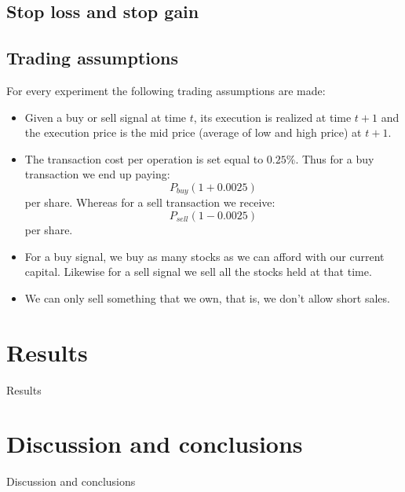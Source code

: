 \documentclass[preprint,3p,twocolumn]{elsarticle}
\begin{document}
\subsection{Stop loss and stop gain}
\label{subsec:stop loss and stop gain}

\subsection{Trading assumptions}
\label{subsec:trading-assumptions}
For every experiment the following trading assumptions are made:

\begin{itemize}
\item Given a buy or sell signal at time $t$, its execution is realized at time $t+1$ and the execution price is the mid price (average of low and high price) at $t+1$.

\item The transaction cost per operation is set equal to $0.25\%$. Thus for a buy transaction we end up paying:
$$ P_{buy} (1 + 0.0025)$$
per share. Whereas for a sell transaction we receive:
$$ P_{sell} (1 - 0.0025)$$ 
per share.

\item For a buy signal, we buy as many stocks as we can afford with our current capital. Likewise for a sell signal we sell all the stocks held at that time.

\item We can only sell something that we own, that is, we don't allow short sales.
\end{itemize}




\section{Results}
\label{sec:results}
Results

\section{Discussion and conclusions}
\label{sec:conclusions}
Discussion and conclusions



\end{document}
